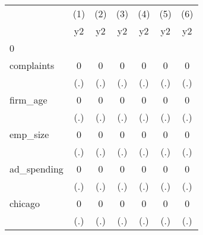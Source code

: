 {
\def\sym#1{\ifmmode^{#1}\else\(^{#1}\)\fi}
\begin{tabular}{l*{6}{c}}
\hline\hline
            &\multicolumn{1}{c}{(1)}&\multicolumn{1}{c}{(2)}&\multicolumn{1}{c}{(3)}&\multicolumn{1}{c}{(4)}&\multicolumn{1}{c}{(5)}&\multicolumn{1}{c}{(6)}\\
            &\multicolumn{1}{c}{y2}&\multicolumn{1}{c}{y2}&\multicolumn{1}{c}{y2}&\multicolumn{1}{c}{y2}&\multicolumn{1}{c}{y2}&\multicolumn{1}{c}{y2}\\
\hline
0           &                     &                     &                     &                     &                     &                     \\
complaints  &           0         &           0         &           0         &           0         &           0         &           0         \\
            &         (.)         &         (.)         &         (.)         &         (.)         &         (.)         &         (.)         \\
[1em]
firm\_age    &           0         &           0         &           0         &           0         &           0         &           0         \\
            &         (.)         &         (.)         &         (.)         &         (.)         &         (.)         &         (.)         \\
[1em]
emp\_size    &           0         &           0         &           0         &           0         &           0         &           0         \\
            &         (.)         &         (.)         &         (.)         &         (.)         &         (.)         &         (.)         \\
[1em]
ad\_spending &           0         &           0         &           0         &           0         &           0         &           0         \\
            &         (.)         &         (.)         &         (.)         &         (.)         &         (.)         &         (.)         \\
[1em]
chicago     &           0         &           0         &           0         &           0         &           0         &           0         \\
            &         (.)         &         (.)         &         (.)         &         (.)         &         (.)         &         (.)         \\

\end{tabular}}
